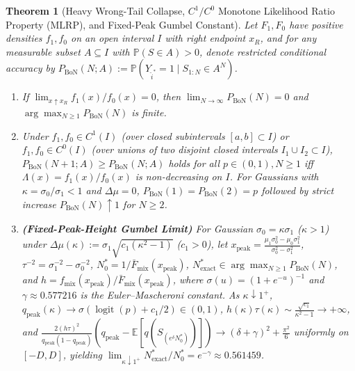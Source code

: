 \documentclass[10pt]{article}
\theoremstyle{plain}
\newtheorem{theorem}{Theorem}
\theoremstyle{definition}
\theoremstyle{remark}
\newcommand{\E}{\mathbb{E}}
\newcommand{\Prob}{\mathbb{P}}
\newcommand{\logit}{\operatorname{logit}}
\newcommand{\barFmix}{\bar{F}_{\mathrm{mix}}}
\newcommand{\fmix}{f_{\mathrm{mix}}}
\begin{document}
\begin{theorem}[Heavy Wrong-Tail Collapse, $C^1/C^0$ Monotone Likelihood Ratio Property ($\mathrm{MLRP}$), and Fixed-Peak Gumbel Constant]
\label{thm:app-collapse}
Let $F_1, F_0$ have positive densities $f_1, f_0$ on an open interval $I$ with right endpoint $x_R$, and for any measurable subset $A \subseteq I$ with $\Prob(S \in A) > 0$, denote restricted conditional accuracy by $P_{\mathrm{BoN}}(N; A) := \Prob(Y_{\hat{i}^*} = 1 \mid S_{1:N} \in A^N)$.
\begin{enumerate}[leftmargin=1.8em,itemsep=2pt]
    \item If $\lim_{x\uparrow x_R} f_1(x)/f_0(x) = 0$, then $\lim_{N\to\infty} P_{\mathrm{BoN}}(N) = 0$ and $\arg\max_{N\ge 1} P_{\mathrm{BoN}}(N)$ is finite.
    \item Under $f_1, f_0 \in C^1(I)$ (over closed subintervals $[a,b] \subset I$) or $f_1, f_0 \in C^0(I)$ (over unions of two disjoint closed intervals $I_1 \cup I_2 \subset I$), $P_{\mathrm{BoN}}(N+1; A) \ge P_{\mathrm{BoN}}(N; A)$ holds for all $p \in (0, 1), N \ge 1$ iff $\Lambda(x) = f_1(x)/f_0(x)$ is non-decreasing on $I$. For Gaussians with $\kappa = \sigma_0/\sigma_1 < 1$ and $\Delta\mu = 0$, $P_{\mathrm{BoN}}(1) = P_{\mathrm{BoN}}(2) = p$ followed by strict increase $P_{\mathrm{BoN}}(N) \uparrow 1$ for $N \ge 2$.
    \item \textbf{(Fixed-Peak-Height Gumbel Limit)} For Gaussian $\sigma_0 = \kappa\sigma_1$ ($\kappa > 1$) under $\Delta\mu(\kappa) := \sigma_1\sqrt{c_1(\kappa^2-1)}$ ($c_1 > 0$), let $x_{\mathrm{peak}} = \frac{\mu_1\sigma_0^2 - \mu_0\sigma_1^2}{\sigma_0^2 - \sigma_1^2}$, $\tau^{-2} = \sigma_1^{-2} - \sigma_0^{-2}$, $N_0^* = 1/\barFmix(x_{\mathrm{peak}})$, $N^*_{\mathrm{exact}} \in \arg\max_{N\ge 1} P_{\mathrm{BoN}}(N)$, and $h = \fmix(x_{\mathrm{peak}})/\barFmix(x_{\mathrm{peak}})$, where $\sigma(u) = (1+e^{-u})^{-1}$ and $\gamma \approx 0.577216$ is the Euler--Mascheroni constant. As $\kappa \downarrow 1^+$, $q_{\mathrm{peak}}(\kappa) \to \sigma(\logit(p) + c_1/2) \in (0, 1)$, $h(\kappa)\tau(\kappa) \sim \frac{\sqrt{c_1}}{\kappa^2 - 1} \to +\infty$, and $\frac{2(h\tau)^2}{q_{\mathrm{peak}}(1-q_{\mathrm{peak}})}(q_{\mathrm{peak}} - \E[q(S_{(e^\delta N_0^*)})]) \to (\delta + \gamma)^2 + \frac{\pi^2}{6}$ uniformly on $[-D, D]$, yielding $\lim_{\kappa \downarrow 1^+} N^*_{\mathrm{exact}} / N_0^* = e^{-\gamma} \approx 0.561459$.
\end{enumerate}
\end{theorem}
\end{document}
